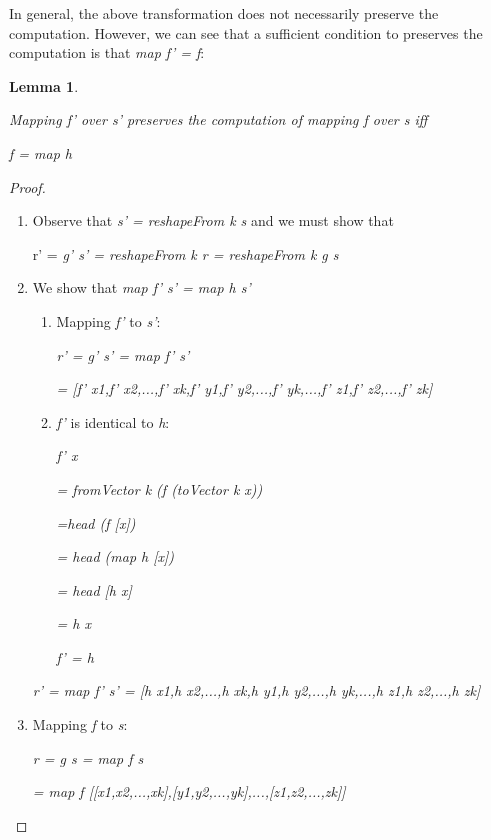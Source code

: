 \documentclass{article}
\newtheorem{lemma}{Lemma}
\begin{document}
In general, the above transformation does not necessarily preserve
the computation. However, we can see that a sufficient condition to
preserves the computation is that\emph{ map f' = f}:

\begin{lemma}\label{ConditionOnReducedDim}

Mapping \emph{f'} over \emph{s'} preserves the computation of mapping
\emph{f} over \emph{s} iff 

\emph{f = map h}

\end{lemma}

\begin{proof}

~
\begin{enumerate}
\item Observe that \emph{s' = reshapeFrom k s} and we must show that 


r' = \emph{g' s' = reshapeFrom k r = reshapeFrom k g s}

\item We show that \emph{map f' s' = map h s'}

\begin{enumerate}
\item Mapping \emph{f'} to \emph{s'}:


\emph{r' = g' s' = map f' s'}


\emph{= {[}f' x1,f' x2,...,f' xk,f' y1,f' y2,...,f' yk,...,f' z1,f'
z2,...,f' zk{]}}

\item \emph{f'} is identical to \emph{h}:


\emph{f' x}


\emph{= fromVector k (f (toVector k x))}


\emph{=head (f {[}x{]})}


\emph{= head (map h {[}x{]})}


\emph{= head {[}h x{]}}


\emph{= h x}


\emph{f' = h}

\end{enumerate}

\emph{ r' = map f' s' = {[}h x1,h x2,...,h xk,h y1,h
y2,...,h yk,...,h z1,h z2,...,h zk{]}}

\item Mapping \emph{f} to \emph{s}:


\emph{r = g s = map f s }


\emph{= map f {[}{[}x1,x2,...,xk{]},{[}y1,y2,...,yk{]},...,{[}z1,z2,...,zk{]}{]}}



\end{enumerate}
\end{proof}
\end{document}
